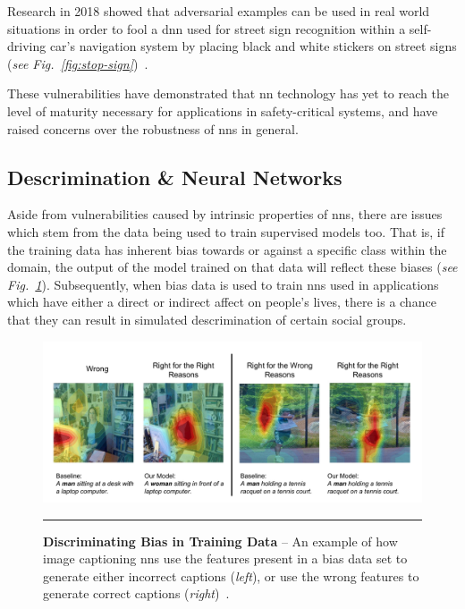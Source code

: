 Research in 2018 showed that adversarial examples can be 
used in real world situations in order to fool a \gls{dnn} used for street sign 
recognition within a self-driving car's navigation system by placing black and white stickers
on street signs (\textit{see Fig.~\ref{fig:stop-sign}})~\citep{eykholt2018}.

These vulnerabilities have demonstrated that \gls{nn} technology has yet to reach the level of
maturity necessary for applications in safety-critical systems, and have raised
concerns over the robustness of \glspl{nn} in general.


\subsection{Descrimination \& Neural Networks}\label{section:descrimination}

Aside from vulnerabilities caused by intrinsic properties of \glspl{nn}, there are
issues which stem from the data being used to train supervised models too. That is,
if the training data has inherent bias towards or against a specific class within the domain, the output 
of the model trained on that data will reflect these biases (\textit{see Fig.~\ref{fig:bias-nn}}). 
Subsequently, when bias data is used to train \glspl{nn} used in applications which have either a direct or
indirect affect on people's lives, there is a chance that they can result in simulated descrimination of certain social groups.

\begin{figure}[H]
\center
\includegraphics[width=1\textwidth]{media/literature/bias-nn.png}
    \rule{35em}{0.5pt}
    \caption[Example of negative bias effects in neural networks]{\textbf{Discriminating Bias in Training Data} -- An example of how image captioning \glspl{nn} use the features present in a bias data set to generate either incorrect captions (\textit{left}), or use the wrong features to generate correct captions (\textit{right})~\citep{burns2019}.}\label{fig:bias-nn}
\end{figure}

